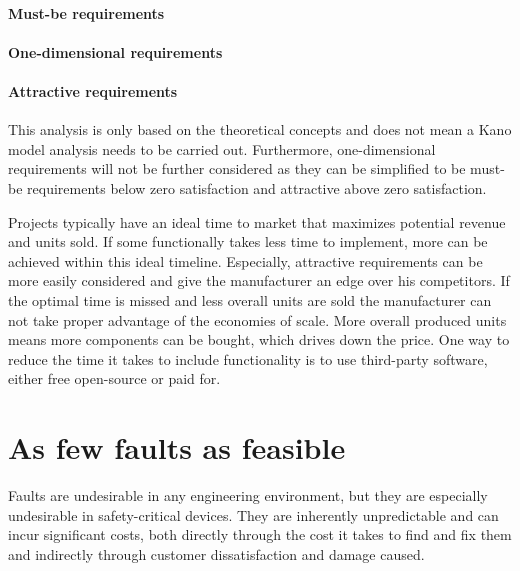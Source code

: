 \paragraph{Must-be requirements}  \autocite{sauerwein1996kano}

\paragraph{One-dimensional requirements} \autocite{sauerwein1996kano}

\paragraph{Attractive requirements} \autocite{sauerwein1996kano}

This analysis is only based on the theoretical concepts and does not mean a Kano model analysis needs to be carried out. Furthermore, one-dimensional requirements will not be further considered as they can be simplified to be must-be requirements below zero satisfaction and attractive above zero satisfaction. 

Projects typically have an ideal time to market \cite{clark1989project}\cite{stalk1988time} that maximizes potential revenue and units sold. If some functionally takes less time to implement, more can be achieved within this ideal timeline. Especially, attractive requirements can be more easily considered and give the manufacturer an edge over his competitors. If the optimal time is missed and less overall units are sold the manufacturer can not take proper advantage of the economies of scale. More overall produced units means more components can be bought, which drives down the price. One way to reduce the time it takes to include functionality is to use third-party software, either free open-source or paid for. 

\section{As few faults as feasible}
Faults are undesirable in any engineering environment, but they are especially undesirable in safety-critical devices. They are inherently unpredictable and can incur significant costs, both directly through the cost it takes to find and fix them and indirectly through customer dissatisfaction and damage caused.

